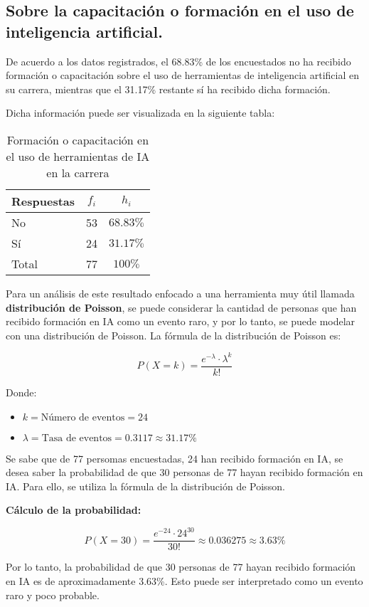 \subsection{Sobre la capacitación o formación en el uso de inteligencia artificial.}



De acuerdo a los datos registrados, el 68.83\% de los encuestados no ha recibido formación o capacitación sobre el uso de herramientas de inteligencia artificial en su carrera, mientras que el 31.17\% restante sí ha recibido dicha formación.

Dicha información puede ser visualizada en la siguiente tabla:

\begin{table}[H]
  \centering
  \renewcommand{\arraystretch}{1.5}
  \begin{tabular}{l c c }
    \hline
    Respuestas & \(f_i\) & \(h_i\) \\
    \hline
    No & 53 & \(68.83\%\) \\
    Sí & 24 & \(31.17\%\) \\
    \hline
    Total & 77 & \(100\%\) \\
  \end{tabular}
  \caption{Formación o capacitación en el uso de herramientas de IA en la carrera}
  \label{tabla:formacionIA}
\end{table}

Para un análisis de este resultado enfocado a una herramienta muy útil llamada \textbf{distribución de Poisson}, se puede considerar la cantidad de personas que han recibido formación en IA como un evento raro, y por lo tanto, se puede modelar con una distribución de Poisson. La fórmula de la distribución de Poisson es:

\begin{equation*}
  P(X = k) = \frac{e^{-\lambda} \cdot \lambda^k}{k!}
\end{equation*}

Donde:
\begin{itemize}
  \item \(k = \text{Número de eventos} = 24\)
  \item \(\lambda = \text{Tasa de eventos} = 0.3117 \approx 31.17\%\)
\end{itemize}

Se sabe que de 77 persomas encuestadas, 24 han recibido formación en IA, se desea saber la probabilidad de que 30 personas de 77 hayan recibido formación en IA. Para ello, se utiliza la fórmula de la distribución de Poisson.

\textbf{Cálculo de la probabilidad:}

\begin{equation*}
  P(X = 30) = \frac{e^{-24} \cdot 24^{30}}{30!} \approx 0.036275 \approx 3.63\%
\end{equation*}

Por lo tanto, la probabilidad de que 30 personas de 77 hayan recibido formación en IA es de aproximadamente 3.63\%. Esto puede ser interpretado como un evento raro y poco probable.